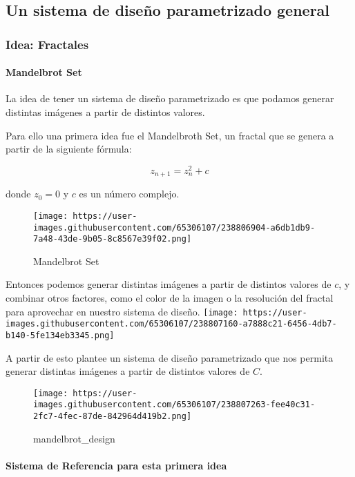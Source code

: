 \documentclass[
]{article}
\begin{document}
\hypertarget{un-sistema-de-diseuxf1o-parametrizado-general}{%
\subsection{Un sistema de diseño parametrizado
general}\label{un-sistema-de-diseuxf1o-parametrizado-general}}

\hypertarget{idea-fractales}{%
\subsubsection{Idea: Fractales}\label{idea-fractales}}

\hypertarget{mandelbrot-set}{%
\paragraph{Mandelbrot Set}\label{mandelbrot-set}}

La idea de tener un sistema de diseño parametrizado es que podamos
generar distintas imágenes a partir de distintos valores.

Para ello una primera idea fue el Mandelbroth Set, un fractal que se
genera a partir de la siguiente fórmula:

\[
z_{n+1} = z_n^2 + c
\]

donde \(z_0 = 0\) y \(c\) es un número complejo.

\begin{figure}
\centering
\texttt{[image: https://user-images.githubusercontent.com/65306107/238806904-a6db1db9-7a48-43de-9b05-8c8567e39f02.png]}
\caption{Mandelbrot Set}
\end{figure}

Entonces podemos generar distintas imágenes a partir de distintos
valores de \(c\), y combinar otros factores, como el color de la imagen
o la resolución del fractal para aprovechar en nuestro sistema de
diseño.
\texttt{[image: https://user-images.githubusercontent.com/65306107/238807160-a7888c21-6456-4db7-b140-5fe134eb3345.png]}

A partir de esto plantee un sistema de diseño parametrizado que nos
permita generar distintas imágenes a partir de distintos valores de
\(C\).

\begin{figure}
\centering
\texttt{[image: https://user-images.githubusercontent.com/65306107/238807263-fee40c31-2fc7-4fec-87de-842964d419b2.png]}
\caption{mandelbrot\_design}
\end{figure}

\hypertarget{sistema-de-referencia-para-esta-primera-idea}{%
\paragraph{Sistema de Referencia para esta primera
idea}\label{sistema-de-referencia-para-esta-primera-idea}}
\end{document}
